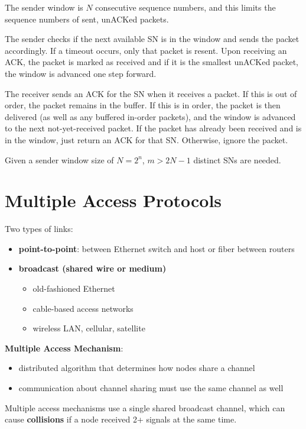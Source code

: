\documentclass[11pt]{article}
\begin{document}
The sender window is \(N\) consecutive sequence numbers, and this limits the sequence numbers of
sent, unACKed packets.

The sender checks if the next available SN is in the window and sends the packet accordingly.
If a timeout occurs, only that packet is resent.
Upon receiving an ACK, the packet is marked as received and if it is the smallest unACKed packet,
the window is advanced one step forward.

The receiver sends an ACK for the SN when it receives a packet.
If this is out of order, the packet remains in the buffer.
If this is in order, the packet is then delivered (as well as any buffered in-order packets),
and the window is advanced to the next not-yet-received packet.
If the packet has already been received and is in the window, just return an ACK for that SN.
Otherwise, ignore the packet.

Given a sender window size of \(N = 2^{n}\), \(m > 2N-1\) distinct SNs are needed.
\section{Multiple Access Protocols}
\label{sec:orgb736fb4}
Two types of links:
\begin{itemize}
\item \textbf{point-to-point}: between Ethernet switch and host or fiber between routers
\item \textbf{broadcast (shared wire or medium)}
\begin{itemize}
\item old-fashioned Ethernet
\item cable-based access networks
\item wireless LAN, cellular, satellite
\end{itemize}
\end{itemize}

\textbf{Multiple Access Mechanism}:
\begin{itemize}
\item distributed algorithm that determines how nodes share a channel
\item communication about channel sharing must use the same channel as well
\end{itemize}

Multiple access mechanisms use a single shared broadcast channel, which can cause \textbf{collisions} if a
node received 2+ signals at the same time.
\end{document}
